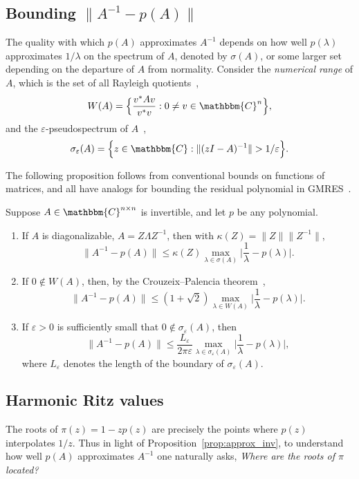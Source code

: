 \documentclass{siamart}
\def\C{\mathbbm{C}}
\def\eps{\varepsilon}
\begin{document}
\subsection{Bounding \boldmath $\|A^{-1} - p(A)\|$}

The quality with which $p(A)$ approximates $A^{-1}$ depends on how well $p(\lambda)$ approximates $1/\lambda$ on the spectrum of $A$, denoted by $\sigma(A)$, or some larger set depending on the departure of $A$ from normality.  
Consider the \emph{numerical range} of $A$, which is the set of all Rayleigh quotients~\cite[chap.~1]{HJ91},
\[ W(A) = \Big\{ \frac{v^* A v}{ v^*v} : 0 \ne v \in \C^n\Big\},\]
and the $\eps$-pseudospectrum of $A$~\cite{TrEm},
\[ \sigma_\eps(A) = \Big\{ z \in \C: \|(zI-A)^{-1}\| > 1/\eps\Big\}.
\]

The following proposition follows from conventional bounds on functions of matrices, and all have analogs for bounding the residual polynomial in GMRES~\cite{Emb22}.

\begin{proposition} \label{prop:approx_inv}
Suppose $A\in\C^{n\times n}$ is invertible, and let $p$ be any polynomial.
\begin{enumerate}
\item  If $A$ is diagonalizable, $A=Z \Lambda Z^{-1}$, then with $\kappa(Z) = \|Z\| \|Z^{-1}\|$, 
\[ \|A^{-1} - p(A)\| \le \kappa(Z) \max_{\lambda \in \sigma(A)} \Big|\frac{1}{\lambda} - p(\lambda)\Big|.
\]
\item If $0 \not \in W(A)$, then, by the Crouzeix--Palencia theorem~\cite{CP17},
\[ \|A^{-1} - p(A)\| \le (1+\sqrt{2}) \max_{\lambda \in W(A)} \Big|\frac{1}{\lambda} - p(\lambda)\Big|.
\]
\item If $\eps>0$ is sufficiently small that $0 \not \in \sigma_\eps(A)$, then
\[ \|A^{-1} - p(A)\| \le \frac{L_\eps}{2\pi\eps} \max_{\lambda \in \sigma_\eps(A)} \Big|\frac{1}{\lambda} - p(\lambda)\Big|,
\]
where $L_\eps$ denotes the length of the boundary of $\sigma_\eps(A)$.
\end{enumerate}
\end{proposition}


\subsection{Harmonic Ritz values} \label{sec:hritz}
The roots of $\pi(z) = 1 - z p(z)$ are precisely the points where $p(z)$ interpolates $1/z$.  Thus in light of Proposition~\ref{prop:approx_inv}, to understand how well $p(A)$ approximates $A^{-1}$ one naturally asks, \emph{Where are the roots of $\pi$ located?} 
\end{document}
